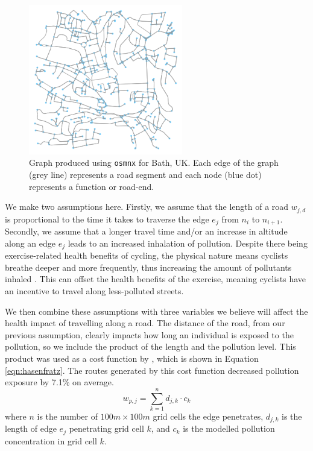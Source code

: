 \documentclass[11pt]{report}
\begin{document}
\begin{figure}[!tb]
\centering
\includegraphics[width=0.6\textwidth]{images/network_graph}
\caption[\texttt{osmnx} graph for Bath.]{Graph produced using \texttt{osmnx} for Bath, UK. Each edge of the graph (grey line) represents a road segment and each node (blue dot) represents a function or road-end.}
\label{fig:network_graph}
\end{figure}

We make two assumptions here. Firstly, we assume that the length of a road $w_{j, d}$ is proportional to the time it takes to traverse the edge $e_j$ from $n_i$ to $n_{i+1}$. Secondly, we assume that a longer travel time and/or an increase in altitude along an edge $e_j$ leads to an increased inhalation of pollution. Despite there being exercise-related health benefits of cycling, the physical nature means cyclists breathe deeper and more frequently, thus increasing the amount of pollutants inhaled \citep{bigazzi2014reviewintake, Ramos2016inhaleddose}. This can offset the health benefits of the exercise, meaning cyclists have an incentive to travel along less-polluted streets.

We then combine these assumptions with three variables we believe will affect the health impact of travelling along a road. The distance of the road, from our previous assumption, clearly impacts how long an individual is exposed to the pollution, so we include the product of the length and the pollution level. This product was used as a cost function by \cite{Hasenfratz2015highresmapsTram}, which is shown in Equation \ref{eqn:hasenfratz}. The routes generated by this cost function decreased pollution exposure by 7.1\% on average.
\begin{equation} \label{eqn:hasenfratz}
w_{p, j} = \sum_{k=1}^{n} d_{j, k} \cdot c_k
\end{equation}
where $n$ is the number of $100m \times 100m$ grid cells the edge penetrates, $d_{j, k}$ is the length of edge $e_j$ penetrating grid cell $k$, and $c_k$ is the modelled pollution concentration in grid cell $k$.
\end{document}

